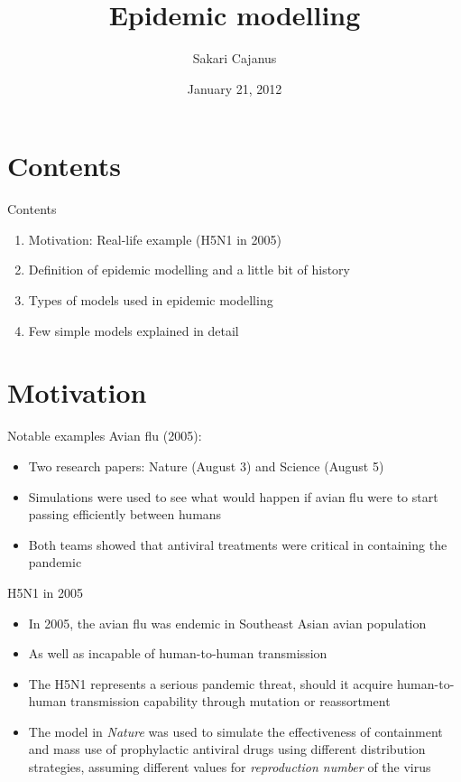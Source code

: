 \documentclass{beamer}
\author{Sakari Cajanus}
\title[Computational Systems Biology]{Epidemic modelling}
\institute{Aalto University}
\date{January 21, 2012}
\begin{document}
\begin{frame}
\titlepage
\end{frame}

\section{Contents}
\begin{frame}{Contents}
\begin{enumerate}
\item Motivation: Real-life example (H5N1 in 2005)
\item Definition of epidemic modelling and a little bit of history
\item Types of models used in epidemic modelling
\item Few simple models explained in detail
\end{enumerate}
\end{frame}

\section{Motivation}
\begin{frame}{Notable examples}
Avian flu (2005):
\begin{itemize}
\item Two research papers: Nature (August 3) and Science (August 5)
\item Simulations were used to see what would happen if avian flu were to start passing efficiently between humans
\item Both teams showed that antiviral treatments were critical in containing the pandemic
\end{itemize}
\end{frame}

\begin{frame}{H5N1 in 2005}
\begin{itemize}
\item In 2005, the avian flu was endemic in Southeast Asian avian population
\item As well as incapable of human-to-human transmission
\item The H5N1 represents a serious pandemic threat, should it acquire human-to-human transmission capability through mutation or reassortment
\item The model in \emph{Nature} was used to simulate the effectiveness of containment and mass use of prophylactic antiviral drugs using different distribution strategies, assuming different values for \emph{reproduction number} of the virus
\end{itemize}
\end{frame}
\end{document}
